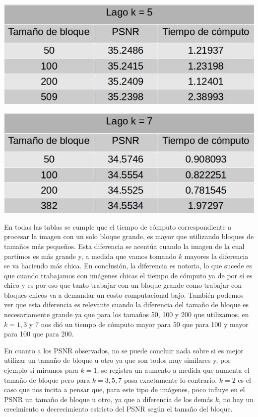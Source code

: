 \documentclass[a4paper]{article}
\begin{document}
\centerline{
\includegraphics[scale=0.5]{imagenes/lagok5Tabla.jpg}
}
\vspace{1cm}

\centerline{
\includegraphics[scale=0.5]{imagenes/lagok7Tabla.jpg}
}
En todas las tablas se cumple que el tiempo de cómputo correspondiente a procesar la imagen con un solo bloque grande, es mayor que utilizando bloques de tamaños más pequeños. Esta diferencia se acentúa cuando la imagen de la cual partimos es más grande y, a medida que vamos tomando $k$ mayores la diferencia se va haciendo más chica. En conclusión, la diferencia es notoria, lo que sucede es que cuando trabajamos con imágenes chicas el tiempo de cómputo ya de por sí es chico y es por eso que tanto trabajar con un bloque grande como trabajar con bloques chicos va a demandar un costo computacional bajo. También podemos ver que esta diferencia es relevante cuando la diferencia del tamaño de bloque es necesariamente grande ya que para los tamaños 50, 100 y 200 que utilizamos, en $k = 1, 3$ y $7$ nos dió un tiempo de cómputo mayor para 50 que para 100 y mayor para 100 que para 200.
\par En cuanto a los PSNR observados, no se puede concluir nada sobre si es mejor utilizar un tamaño de bloque u otro ya que son todos muy similares y, por ejemplo si miramos para $k = 1$, se registra un aumento a medida que aumenta el tamaño de bloque pero para $k = 3, 5, 7$ pasa exactamente lo contrario. $k = 2$ es el caso que nos incita a pensar que, para este tipo de imágenes, poco influye en el PSNR un tamaño de bloque u otro, ya que a diferencia de los demás $k$, no hay un crecimiento o decrecimiento estricto del PSNR según el tamaño del bloque.
\end{document}
